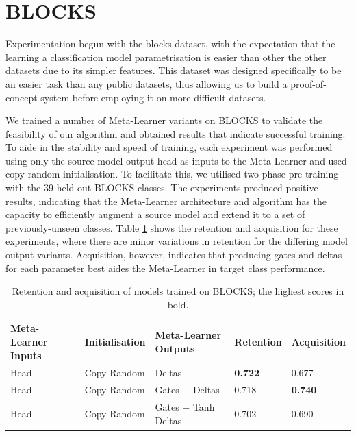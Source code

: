 \documentclass{report}
\begin{document}
\section{BLOCKS}
Experimentation begun with the blocks dataset, with the expectation that the learning a classification model parametrisation is easier than other the other datasets due to its simpler features. This dataset was designed specifically to be an easier task than any public datasets, thus allowing us to build a proof-of-concept system before employing it on more difficult datasets. \par
We trained a number of Meta-Learner variants on BLOCKS to validate the feasibility of our algorithm and obtained results that indicate successful training. To aide in the stability and speed of training, each experiment was performed using only the source model output head as inputs to the Meta-Learner and used copy-random initialisation. To facilitate this, we utilised two-phase pre-training with the 39 held-out BLOCKS classes. The experiments produced positive results, indicating that the Meta-Learner architecture and algorithm has the capacity to efficiently augment a source model and extend it to a set of previously-unseen classes. Table \ref{tab:blocks-scores} shows the retention and acquisition for these experiments, where there are minor variations in retention for the differing model output variants. Acquisition, however, indicates that producing gates and deltas for each parameter best aides the Meta-Learner in target class performance. \par

\begin{table}[h] \label{tab:blocks-scores}
	\centering
	\begin{tabular}{|l|l|l|l|l|}
		\hline
		Meta-Learner Inputs & Initialisation & Meta-Learner Outputs & Retention      & Acquisition    \\ \hline
		Head                & Copy-Random    & Deltas               & \textbf{0.722} & 0.677          \\ \hline
		Head                & Copy-Random    & Gates + Deltas       & 0.718          & \textbf{0.740} \\ \hline
		Head                & Copy-Random    & Gates + Tanh Deltas  & 0.702          & 0.690          \\ \hline
	\end{tabular}
	\caption{Retention and acquisition of models trained on BLOCKS; the highest scores in bold.}
\end{table}
\end{document}
